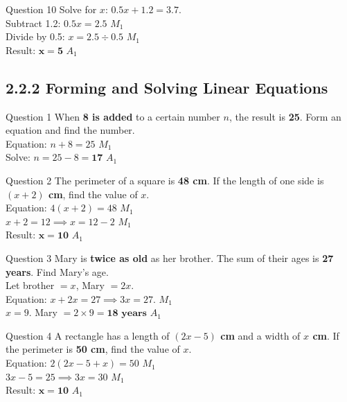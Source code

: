 \documentclass[12pt, a4paper, oneside]{article}
\begin{document}
\begin{solvingbox}{Question 10}
Solve for $x$: $0.5x + 1.2 = 3.7$. \\
Subtract 1.2: $0.5x = 2.5$ \hfill $M_1$ \\
Divide by 0.5: $x = 2.5 \div 0.5$ \hfill $M_1$ \\
Result: $\mathbf{x = 5}$ \hfill $A_1$
\end{solvingbox}
\newpage
\subsection*{2.2.2 Forming and Solving Linear Equations}

\begin{solvingbox}{Question 1}
When \textbf{8 is added} to a certain number $n$, the result is \textbf{25}. Form an equation and find the number. \\
Equation: $n + 8 = 25$ \hfill $M_1$ \\
Solve: $n = 25 - 8 = \mathbf{17}$ \hfill $A_1$
\end{solvingbox}

\begin{solvingbox}{Question 2}
The perimeter of a square is \textbf{48 cm}. If the length of one side is \textbf{$(x + 2)$ cm}, find the value of $x$. \\
Equation: $4(x + 2) = 48$ \hfill $M_1$ \\
$x + 2 = 12 \implies x = 12 - 2$ \hfill $M_1$ \\
Result: $\mathbf{x = 10}$ \hfill $A_1$
\end{solvingbox}

\begin{solvingbox}{Question 3}
Mary is \textbf{twice as old} as her brother. The sum of their ages is \textbf{27 years}. Find Mary's age. \\
Let brother $= x$, Mary $= 2x$. \\
Equation: $x + 2x = 27 \implies 3x = 27$. \hfill $M_1$ \\
$x = 9$. Mary $= 2 \times 9 = \mathbf{18\text{ years}}$ \hfill $A_1$
\end{solvingbox}

\begin{solvingbox}{Question 4}
A rectangle has a length of \textbf{$(2x - 5)$ cm} and a width of \textbf{$x$ cm}. If the perimeter is \textbf{50 cm}, find the value of $x$. \\
Equation: $2(2x - 5 + x) = 50$ \hfill $M_1$ \\
$3x - 5 = 25 \implies 3x = 30$ \hfill $M_1$ \\
Result: $\mathbf{x = 10}$ \hfill $A_1$
\end{solvingbox}
\end{document}
